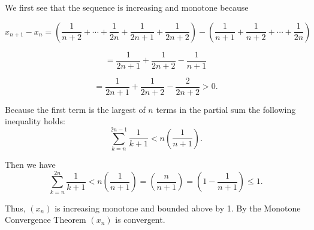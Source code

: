 \documentclass{report}
\begin{document}
\begin{myproof}

We first see that the sequence is increasing and monotone because 

$$x_{n+1} - x_{n}= 
\left(\frac{1}{n+2}+\cdots+\frac{1}{2 n} + \frac{1}{2n+1} + \frac{1}{2n+2} \right) - \left(\frac{1}{n+1}+\frac{1}{n+2}+\cdots+\frac{1}{2 n}\right)$$  

$$ =  \frac{1}{2n+1} + \frac{1}{2n+2} - \frac{1}{n+1}$$

$$ =  \frac{1}{2n+1} + \frac{1}{2n+2} - \frac{2}{2n+2} > 0.$$



Because the first term is the largest of $n$ terms in the partial sum   the following inequality holds:
$$ \sum_{k =n}^{2n-1} \frac{1}{k+1} < n\left(\frac{1}{n+1}\right).$$

Then we have
$$ \sum_{k =n}^{2n} \frac{1}{k+1} < n\left(\frac{1}{n+1}\right) = \left(\frac{n}{n+1}\right) =\left(1 - \frac{1}{n + 1}\right) \leq 1.$$

Thus, $(x_n)$ is increasing monotone and bounded above by 1. By the Monotone Convergence Theorem $(x_n)$ is convergent.

\end{myproof}



\end{document}
